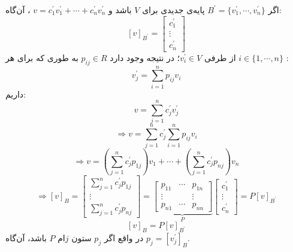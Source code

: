 اگر $B^\prime= \{v_1^\prime,\cdots,v_n^\prime\}$ پایه‌ی جدیدی برای $V$ باشد و
 $v = c_1^\prime v_1^\prime+\cdots+c_n^\prime v_n^\prime$
 ، آن‌گاه:
$$[v]_{B^\prime} = \begin{bmatrix}
c_1^\prime \\ \vdots \\ c_n^\prime
\end{bmatrix}$$
از طرفی $v_i^\prime \in V$؛ در نتیجه وجود دارد $p_{ij} \in R$ به طوری که برای هر
$i \in \{ 1,\cdots,n \} $
:
$$v_j^\prime = \sum_{i=1}^{n} p_{ij} v_i$$
داریم:
$$v= \sum_{j=1}^{n} c_{j}^\prime v_j^\prime$$
$$\Rightarrow v= \sum_{j=1}^{n} c_{j}^\prime \sum_{i=1}^{n} p_{ij} v_i$$
$$\Rightarrow v= (\sum_{j=1}^{n} c_{j}^\prime p_{1j})v_1+\cdots+(\sum_{j=1}^{n} c_{j}^\prime p_{nj})v_n$$
$$\Rightarrow[v]_B =\begin{bmatrix}
\sum_{j=1}^{n} c_{j}^\prime p_{1j}\\
\vdots\\
\sum_{j=1}^{n} c_{j}^\prime p_{nj}
\end{bmatrix} = \underbrace{\begin{bmatrix}
	p_{11}& \cdots &p_{1n}\\
	\vdots && \vdots\\
	p_{n1} &\cdots& p_{nn}
	\end{bmatrix}}_P\begin{bmatrix}
c_1^\prime\\
\vdots\\
c_n^\prime
\end{bmatrix} = P[v]_{B^\prime}$$
$$[v]_B = P[v]_{B^\prime}$$
در واقع اگر $p_j$ ستون $j$ام $P$ باشد، آن‌گاه $p_j = [v_j^\prime]_B$.

